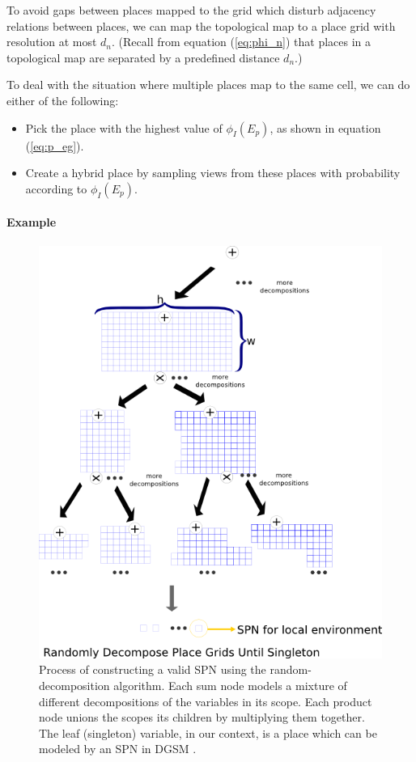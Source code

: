\documentclass[10pt, titlepage]{article}
\theoremstyle{definition}
\begin{document}
To avoid gaps between places mapped to the grid which disturb adjacency relations between places, we can map the topological map to a place grid with resolution at most $d_n$. (Recall from equation (\ref{eq:phi_n}) that places in a topological map are separated by a predefined distance $d_n$.)

To deal with the situation where multiple places map to the same cell, we can do either of the following:
\begin{itemize}
\item Pick the place with the highest value of $\phi_I(E_p)$, as shown in equation (\ref{eq:p_eg}). 
\item Create a hybrid place by sampling views from these places with probability according to $\phi_I(E_p)$.
\end{itemize}

\paragraph{Example} 

\begin{figure}[!htb]
    \centering
    \captionsetup{width=.8\linewidth}
    \includegraphics[scale=0.6]{images/spn_grid.png}
    \caption{Process of constructing a valid SPN using the random-decomposition algorithm. Each sum node models a mixture of different decompositions of the variables in its scope. Each product node unions the scopes its children by multiplying them together. The leaf (singleton) variable, in our context, is a place which can be modeled by an SPN in DGSM \cite{pronobis2016learning}.}
    \label{fig:grid_learn}
\end{figure}
\end{document}
